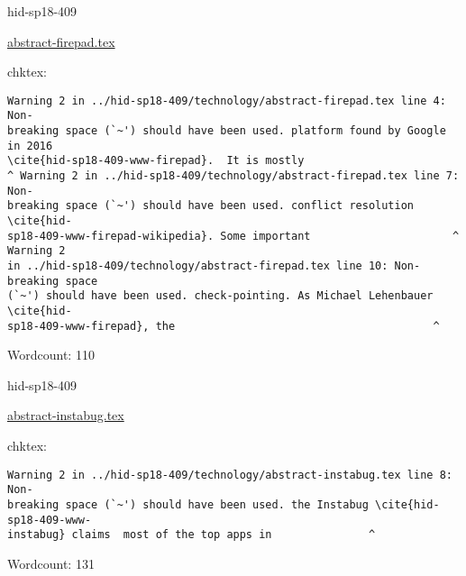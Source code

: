 \begin{IU}

hid-sp18-409

\href{https://github.com/cloudmesh-community/hid-sp18-409/blob/master//technology/abstract-firepad.tex}{abstract-firepad.tex}

 
chktex:
\begin{tiny}
\begin{verbatim}
Warning 2 in ../hid-sp18-409/technology/abstract-firepad.tex line 4: Non-
breaking space (`~') should have been used. platform found by Google in 2016
\cite{hid-sp18-409-www-firepad}.  It is mostly
^ Warning 2 in ../hid-sp18-409/technology/abstract-firepad.tex line 7: Non-
breaking space (`~') should have been used. conflict resolution \cite{hid-
sp18-409-www-firepad-wikipedia}. Some important                      ^ Warning 2
in ../hid-sp18-409/technology/abstract-firepad.tex line 10: Non-breaking space
(`~') should have been used. check-pointing. As Michael Lehenbauer \cite{hid-
sp18-409-www-firepad}, the                                        ^
\end{verbatim}
\end{tiny}

Wordcount: 110

\end{IU}



\begin{IU}

hid-sp18-409

\href{https://github.com/cloudmesh-community/hid-sp18-409/blob/master//technology/abstract-instabug.tex}{abstract-instabug.tex}

 
chktex:
\begin{tiny}
\begin{verbatim}
Warning 2 in ../hid-sp18-409/technology/abstract-instabug.tex line 8: Non-
breaking space (`~') should have been used. the Instabug \cite{hid-sp18-409-www-
instabug} claims  most of the top apps in               ^
\end{verbatim}
\end{tiny}

Wordcount: 131

\end{IU}



